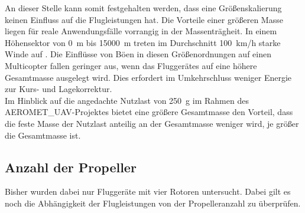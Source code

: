 An dieser Stelle kann somit festgehalten werden, dass eine Größenskalierung keinen Einfluss auf die Flugleistungen hat. Die Vorteile einer größeren Masse liegen für reale Anwendungsfälle vorrangig in der Massenträgheit. In einem Höhensektor von \SI{0}{m} bis \SI{15000}{m} treten im Durchschnitt \SI{100}{km/h} starke Winde auf \cite{Seidel.2011}. Die Einflüsse von Böen in diesen Größenordnungen auf einen Multicopter fallen geringer aus, wenn das Fluggerätes auf eine höhere Gesamtmasse ausgelegt wird. Dies erfordert im Umkehrschluss weniger Energie zur Kurs- und Lagekorrektur. \\
Im Hinblick auf die angedachte Nutzlast von \SI{250}{g} im Rahmen des AEROMET\_UAV-Projektes bietet eine größere Gesamtmasse den Vorteil, dass die feste Masse der Nutzlast anteilig an der Gesamtmasse weniger wird, je größer die Gesamtmasse ist.


\subsection{Anzahl der Propeller}
\label{subsec:anz_prop}
Bisher wurden dabei nur Fluggeräte mit vier Rotoren untersucht. Dabei gilt es noch die Abhängigkeit der Flugleistungen von der Propelleranzahl zu überprüfen. 

